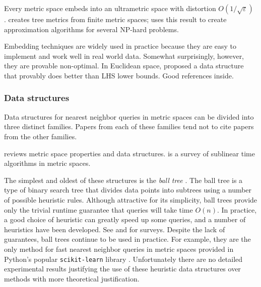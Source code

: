 \documentclass[../main.tex]{subfiles}
\begin{document}
Every metric space embeds into an ultrametric space with distortion $O(1/\sqrt \varepsilon)$ \citep{abraham2007embedding}.
\cite{charikar1998approximating} creates tree metrics from finite metric spaces;
uses this result to create approximation algorithms for several NP-hard problems.

Embedding techniques are widely used in practice because they are easy to implement and work well in real world data.
Somewhat surprisingly, however, they are provable non-optimal.
In Euclidean space, \cite{andoni2014beyond} proposed a data structure that provably does better than LHS lower bounds.
Good references inside.


\subsubsection{Data structures}
Data structures for nearest neighbor queries in metric spaces can be divided into three distinct families. 
Papers from each of these families tend not to cite papers from the other families.

\cite{clarkson2006nearest} reviews metric space properties and data structures.
\cite{czumaj2010sublinear} is a survey of sublinear time algorithms in metric spaces.

The simplest and oldest of these structures is the \emph{ball tree} \citep{omohundro1989}.
The ball tree is a type of binary search tree that divides data points into subtrees using a number of possible heuristic rules.
Although attractive for its simplicity, 
ball trees provide only the trivial runtime guarantee that queries will take time $O(n)$.
In practice, a good choice of heuristic can greatly speed up some queries,
and a number of heuristics have been developed.
See \cite{zezula2006similarity} and \cite{mao2016pivot} for surveys.
Despite the lack of guarantees,
ball trees continue to be used in practice.
For example, they are the only method for fast nearest neighbor queries in metric spaces provided in Python's popular \texttt{scikit-learn} library \citep{scikit-learn}.
Unfortunately there are no detailed experimental results justifying the use of these heuristic data structures over methods with more theoretical justification.
\end{document}
